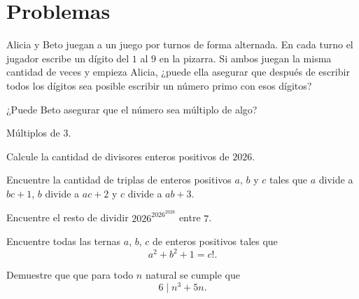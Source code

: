 \chapter{Problemas}
\begin{problem}
Alicia y Beto juegan a un juego
por turnos de forma alternada.
En cada turno el jugador
escribe un dígito del $1$
al $9$ en la pizarra.
Si ambos juegan la misma cantidad de veces
y empieza Alicia,
¿puede ella asegurar que después
de escribir todos los dígitos
sea posible escribir un número primo
con esos dígitos?

\begin{hints}
	\begin{hint}
		¿Puede Beto asegurar que el número sea
		múltiplo de algo?
	\end{hint}

	\begin{hint}
		Múltiplos de $3$.
	\end{hint}
\end{hints}
\end{problem}

\begin{problem}
Calcule la cantidad de divisores enteros positivos de $2026$.
\end{problem}


\begin{problem}
Encuentre la cantidad de triplas de enteros positivos $a$, $b$ y $c$ tales que $a$ divide a $bc + 1$, $b$ divide
a $ac + 2$ y $c$ divide a $ab + 3$.
\end{problem}

\begin{problem}
Encuentre el resto de dividir $2026^{2026^{2026}}$ entre $7$.
\end{problem}

\begin{problem}
Encuentre todas las ternas $a$, $b$, $c$ de enteros positivos
tales que
\[a^2 + b^2 + 1 = c!.\]
\end{problem}

\begin{problem}
Demuestre que que para todo $n$ natural se cumple que
\[6 \mid n^3 + 5n.\]
\end{problem}

